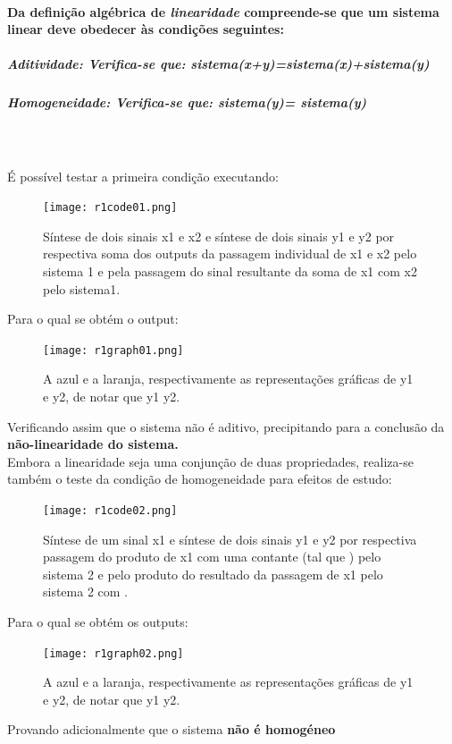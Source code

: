 \documentclass[a4paper,12pt]{article}
\begin{document}
			\paragraph{Da definição algébrica de \textit{linearidade} compreende-se que um sistema linear deve obedecer às condições seguintes:}
				\subparagraph{\textbf{Aditividade:} Verifica-se que: \textit{sistema(x+y)=sistema(x)+sistema(y)}}
				\subparagraph{\textbf{Homogeneidade: Verifica-se que: \textit{sistema(}}\textbf{\alpha \textit{y)=} \alpha \textbf{\textit{sistema(y)}}}} \mbox{}\\ \mbox{}\\
			É possível testar a primeira condição executando:
			\begin{figure}[H]
				\centering
					\captionsetup{justification=centering}
					\texttt{[image: r1code01.png]}
					\caption{Síntese de dois sinais x1 e x2 e síntese de dois sinais y1 e y2 por respectiva soma dos outputs da passagem individual de x1   e x2 pelo sistema 1 e pela passagem do sinal resultante da soma de x1 com x2 pelo sistema1.}
			\end{figure}
			Para o qual se obtém o output:
			\begin{figure}[H]
  				\centering
  				\captionsetup{justification=centering}
  				\texttt{[image: r1graph01.png]}
				\caption{A azul e a laranja, respectivamente as representações gráficas de y1 e y2, de notar que y1 \neq y2.}
			\end{figure}
			Verificando assim que o sistema não é aditivo, precipitando para a conclusão da  \textbf{não-linearidade do sistema.}\\
			Embora a linearidade seja uma conjunção de duas propriedades, realiza-se também o teste da condição de homogeneidade para efeitos de estudo:
 			\begin{figure}[H]
  				\centering
  				\captionsetup{justification=centering}
  				\texttt{[image: r1code02.png]}
				\caption{Síntese de um sinal x1 e síntese de dois sinais y1 e y2 por respectiva passagem do produto de x1 com uma contante \textbeta (tal que ) pelo sistema 2 e pelo produto do resultado da passagem de x1 pelo sistema 2 com \textbeta.}
  			\end{figure}
			Para o qual se obtém os outputs:
			\begin{figure}[H]
    				\centering
    				\captionsetup{justification=centering}
    				\texttt{[image: r1graph02.png]}
				\caption{A azul e a laranja, respectivamente as representações gráficas de y1   e y2, de notar que y1 \neq y2.}
  			\end{figure}
			Provando adicionalmente que o sistema \textbf{não é homogéneo}
			\newpage
\end{document}
